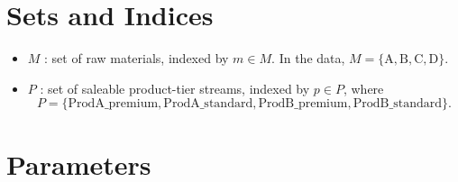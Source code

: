\section*{Sets and Indices}

\begin{itemize}
    \item $M$ : set of raw materials, indexed by $m \in M$. In the data, $M=\{\mathrm{A},\mathrm{B},\mathrm{C},\mathrm{D}\}$.
    \item $P$ : set of saleable product-tier streams, indexed by $p \in P$, where
    \[
    P=\{\mathrm{ProdA\_premium},\mathrm{ProdA\_standard},\mathrm{ProdB\_premium},\mathrm{ProdB\_standard}\}.
    \]
\end{itemize}

\section*{Parameters}

